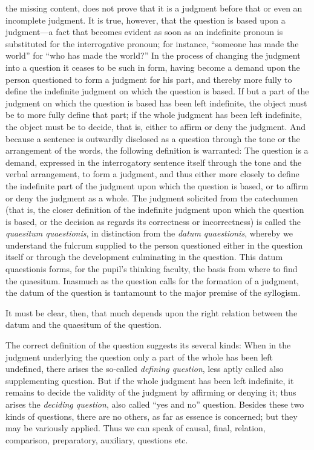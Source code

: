 the missing content, does not prove that it is a judgment before that or even an incomplete judgment. It is true, however, that the question is based upon a judgment—a fact that becomes evident as soon as an indefinite pronoun is substituted for the interrogative pronoun; for instance, “someone has made the world” for “who has made the world?” In the process of changing the judgment into a question it ceases to be such in form, having become a demand upon the person questioned to form a judgment for his part, and thereby more fully to define the indefinite judgment on which the question is based. If but a part of the judgment on which the question is based has been left indefinite, the object must be to more fully define that part; if the whole judgment has been left indefinite, the object must be to decide, that is, either to affirm or deny the judgment. And because a sentence is outwardly disclosed as a question through the tone or the arrangement of the words, the following definition is warranted: The question is a demand, expressed in the interrogatory sentence itself through the tone and the verbal arrangement, to form a judgment, and thus either more closely to define the indefinite part of the judgment upon which the question is based, or to affirm or deny the judgment as a whole. The judgment solicited from the catechumen (that is, the closer definition of the indefinite judgment upon which the question is based, or the decision as regards its correctness or incorrectness) is called the \emph{quaesitum quaestionis}, in distinction from the \emph{datum quaestionis}, whereby we understand the fulcrum supplied to the person questioned either in the question itself or through the development culminating in the question. This datum quaestionis forms, for the pupil’s thinking faculty, the basis from where to find the quaesitum. Inasmuch as the question calls for the formation of a judgment, the datum of the question is tantamount to the major premise of the syllogism.

It must be clear, then, that much depends upon the right relation between the datum and the quaesitum of the question.

The correct definition of the question suggests its several kinds: When in the judgment underlying the question only a part of the whole has been left undefined, there arises the so-called \emph{defining question}, less aptly called also supplementing question. But if the whole judgment has been left indefinite, it remains to decide the validity of the judgment by affirming or denying it; thus arises the \emph{deciding question}, also called “yes and no” question. Besides these two kinds of questions, there are no others, as far as essence is concerned; but they may be variously applied. Thus we can speak of causal, final, relation, comparison, preparatory, auxiliary, questions etc.

